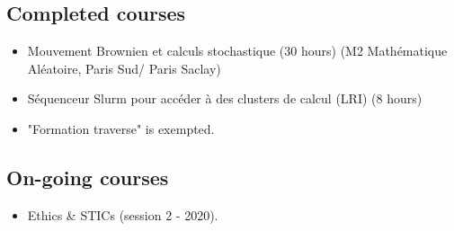 \documentclass[11pt, letterpaper]{article}
\begin{document}
\subsection*{Completed courses}
\begin{itemize}
	\item Mouvement Brownien et calculs stochastique (30 hours) (M2 Mathématique Aléatoire, Paris Sud/ Paris Saclay)
	\item Séquenceur Slurm pour accéder à des clusters de calcul (LRI) (8 hours)
	\item "Formation traverse" is exempted.
\end{itemize}
\subsection*{On-going courses}
\begin{itemize}
	\item Ethics \& STICs (session 2 - 2020).
\end{itemize}
\end{document}

